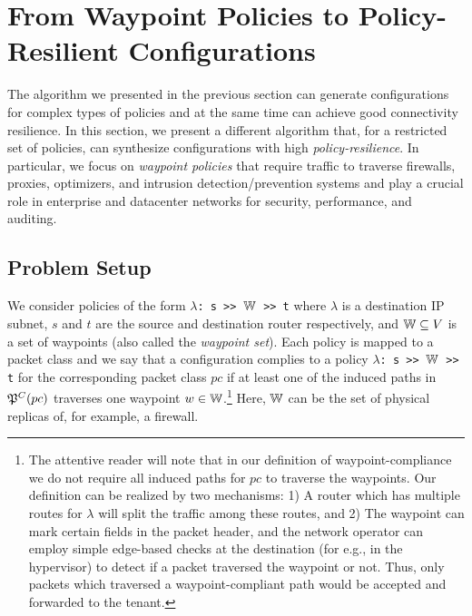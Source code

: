 
\section{From Waypoint Policies to Policy-Resilient Configurations}
\label{sec:waypointres}


The algorithm we presented in the previous section can generate configurations
for complex types of policies and at the same time can achieve good
connectivity resilience.
In this section, we present a different algorithm that, for a restricted set of policies,
can synthesize configurations with high \emph{policy-resilience}.
In particular, we focus on \emph{waypoint policies}
that require traffic to traverse
firewalls,
proxies, optimizers, and intrusion detection/prevention 
systems and
play a crucial role in enterprise and
datacenter networks for security, performance,  
and auditing.

\subsection{Problem Setup}

We consider policies of the form 
\texttt{$\lambda$: s >> $\mathbb{W}$ >> t}
where $\lambda$ is a destination IP subnet,  
$s$ and $t$ are the source and destination router respectively, 
and $\mathbb{W} \subseteq V$ is a set of waypoints (also called the \emph{waypoint set}). 
Each policy is mapped to a packet class and
we say that a configuration complies to a policy 
\texttt{$\lambda$: s >> $\mathbb{W}$ >> t}
 for the corresponding packet class
$pc$ if
at least one of the induced paths in $\mathfrak{P}^C(pc)$ 
traverses one waypoint $w \in \mathbb{W}$.\footnote{
The attentive reader will note that in our definition of waypoint-compliance 
we do not require all induced paths for $pc$ to traverse the waypoints. 
Our 
definition can be realized by two mechanisms: 1) A router
which has multiple routes for $\lambda$ will split the traffic
among these routes, and 2) The waypoint can mark certain fields in
the packet header, and the network operator can employ 
simple edge-based checks at the destination 
(for e.g., in the hypervisor) to 
detect if a packet traversed the waypoint or not. Thus, only
packets which traversed a waypoint-compliant path would be 
accepted and forwarded to the tenant. 
}
Here, $\mathbb{W}$
can be the set of physical replicas of,  for example, a firewall.


